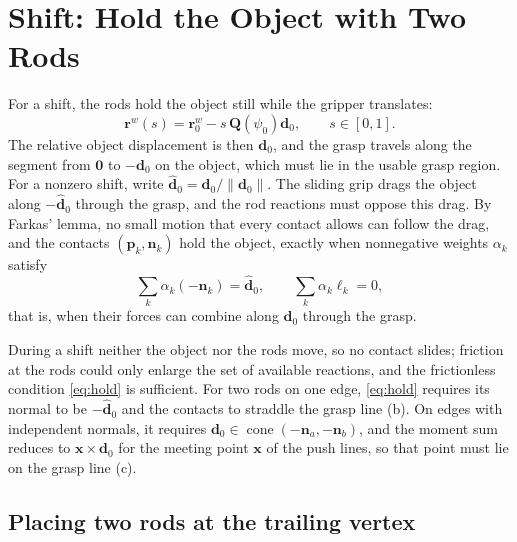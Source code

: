 \section{Shift: Hold the Object with Two Rods}
\label{sec:method}
\label{sec:shift}

For a shift, the rods hold the object still while the gripper translates:
\begin{equation}
  \mathbf r^w(s)=\mathbf r^w_0-s\,\mathbf Q(\psi_0)\mathbf d_0,\qquad s\in[0,1].
  \label{eq:shift_path}
\end{equation}
The relative object displacement is then $\mathbf d_0$, and the grasp travels along the segment from $\mathbf 0$ to $-\mathbf d_0$ on the object, which must lie in the usable grasp region. For a nonzero shift, write $\hat{\mathbf d}_0=\mathbf d_0/\|\mathbf d_0\|$. The sliding grip drags the object along $-\hat{\mathbf d}_0$ through the grasp, and the rod reactions must oppose this drag. By Farkas' lemma, no small motion that every contact allows can follow the drag, and the contacts $(\mathbf p_k,\mathbf n_k)$ hold the object, exactly when nonnegative weights $\alpha_k$ satisfy
\begin{equation}
  \textstyle\sum_k\alpha_k(-\mathbf n_k)=\hat{\mathbf d}_0,\qquad
  \sum_k\alpha_k\ell_k=0,
  \label{eq:hold}
\end{equation}
that is, when their forces can combine along $\mathbf d_0$ through the grasp.

During a shift neither the object nor the rods move, so no contact slides; friction at the rods could only enlarge the set of available reactions, and the frictionless condition \eqref{eq:hold} is sufficient. For two rods on one edge, \eqref{eq:hold} requires its normal to be $-\hat{\mathbf d}_0$ and the contacts to straddle the grasp line (b). On edges with independent normals, it requires $\mathbf d_0\in\operatorname{cone}(-\mathbf n_a,-\mathbf n_b)$, and the moment sum reduces to $\mathbf x\times\mathbf d_0$ for the meeting point $\mathbf x$ of the push lines, so that point must lie on the grasp line (c).



\subsection{Placing two rods at the trailing vertex}

